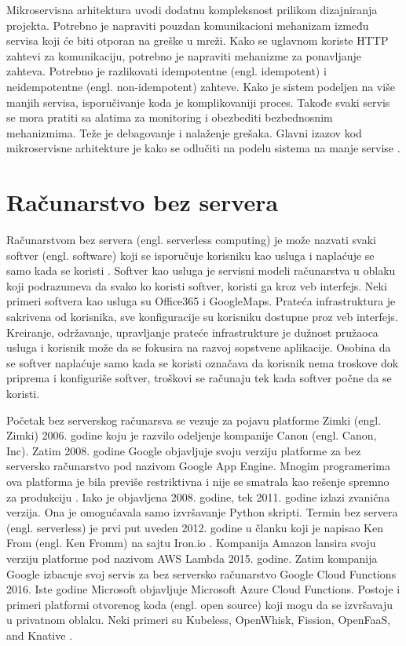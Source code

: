 \documentclass[12pt,oneside]{memoir}
\begin{document}
Mikroservisna arhitektura uvodi dodatnu kompleksnost prilikom dizajniranja projekta. Potrebno je napraviti pouzdan komunikacioni mehanizam između servisa koji će biti otporan na greške u mreži. Kako se uglavnom koriste HTTP zahtevi za komunikaciju, potrebno je napraviti mehanizme za ponavljanje zahteva. Potrebno je razlikovati idempotentne (engl. idempotent) i neidempotentne (engl. non-idempotent) zahteve. Kako je sistem podeljen na više manjih servisa, isporučivanje koda je komplikovaniji proces. Takođe svaki servis se mora pratiti sa alatima za monitoring i obezbediti bezbednosnim mehanizmima. Teže je debagovanje i nalaženje grešaka. Glavni izazov kod mikroservisne arhitekture je kako se odlučiti na podelu sistema na manje servise \cite{bm}.

\chapter{Računarstvo bez servera}
\label{chp:razrada}

Računarstvom bez servera (engl. serverless computing) je može nazvati svaki softver (engl. software) koji se isporučuje korisniku kao usluga i naplaćuje se samo kada se koristi \cite{sa}. Softver kao usluga je servisni modeli računarstva u oblaku koji podrazumeva da svako ko koristi softver, koristi ga kroz veb interfejs. Neki primeri softvera kao usluga su Office365 i GoogleMaps. Prateća infrastruktura je sakrivena od korisnika, sve konfiguracije su korisniku dostupne proz veb interfejs. Kreiranje, održavanje, upravljanje prateće infrastrukture je dužnost pružaoca usluga i korisnik može da se fokusira na razvoj sopstvene aplikacije. Osobina da se softver naplaćuje samo kada se koristi označava da korisnik nema troskove dok priprema i konfiguriše softver, troškovi se računaju tek kada softver počne da se koristi.

Početak bez serverskog računarsva se vezuje za pojavu platforme Zimki (engl. Zimki) 2006. godine koju je razvilo odeljenje kompanije Canon (engl. Canon, Inc). Zatim 2008. godine Google objavljuje svoju verziju platforme za bez serversko računarstvo pod nazivom Google App Engine. Mnogim programerima ova platforma je bila previše restriktivna i nije se smatrala kao rešenje spremno za produkciju \cite{ls}. Iako je objavljena 2008. godine, tek 2011. godine izlazi zvanična verzija. Ona je omogućavala samo izvršavanje Python skripti. Termin bez servera (engl. serverless) je prvi put uveden 2012. godine u članku koji je napisao Ken From (engl. Ken Fromm) na sajtu Iron.io \cite{wtfosaais}. Kompanija Amazon lansira svoju verziju platforme pod nazivom AWS Lambda 2015. godine. Zatim kompanija Google izbacuje svoj servis za bez serversko računarstvo Google Cloud Functions 2016. Iste godine Microsoft objavljuje Microsoft Azure Cloud Functions. Postoje i primeri platformi otvorenog koda (engl. open source) koji mogu da se izvršavaju u privatnom oblaku. Neki primeri su Kubeless, OpenWhisk, Fission, OpenFaaS, and Knative \cite{ws}.
\end{document}
